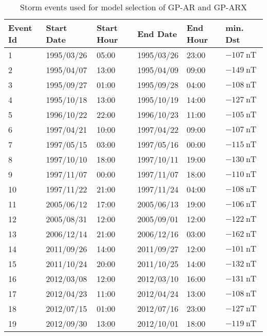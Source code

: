     \begin{table}[h]
    \centering
    \caption{Storm events used for model selection of GP-AR and GP-ARX}
    \label{table:validationstorms}
    \begin{tabular}{llllll}
    \hline
    Event Id & Start Date & Start Hour & End Date & End Hour & min. Dst \\ \hline
    1 & 1995/03/26 & 05:00 & 1995/03/26 & 23:00 & $ \SI{-107}{\nano\tesla}$ \\
    2 & 1995/04/07 & 13:00 & 1995/04/09 & 09:00 & $ \SI{-149}{\nano\tesla}$ \\
    3 & 1995/09/27 & 01:00 & 1995/09/28 & 04:00 & $ \SI{-108}{\nano\tesla}$ \\
    4 & 1995/10/18 & 13:00 & 1995/10/19 & 14:00 & $ \SI{-127}{\nano\tesla}$ \\
    5 & 1996/10/22 & 22:00 & 1996/10/23 & 11:00 & $ \SI{-105}{\nano\tesla}$ \\
    6 & 1997/04/21 & 10:00 & 1997/04/22 & 09:00 & $ \SI{-107}{\nano\tesla}$ \\
    7 & 1997/05/15 & 03:00 & 1997/05/16 & 00:00 & $ \SI{-115}{\nano\tesla}$ \\
    8 & 1997/10/10 & 18:00 & 1997/10/11 & 19:00 & $ \SI{-130}{\nano\tesla}$ \\
    9 & 1997/11/07 & 00:00 & 1997/11/07 & 18:00 & $ \SI{-110}{\nano\tesla}$ \\
    10 & 1997/11/22 & 21:00 & 1997/11/24 & 04:00 & $ \SI{-108}{\nano\tesla}$ \\
    11 & 2005/06/12 & 17:00 & 2005/06/13 & 19:00 & $ \SI{-106}{\nano\tesla}$ \\
    12 & 2005/08/31 & 12:00 & 2005/09/01 & 12:00 & $ \SI{-122}{\nano\tesla}$ \\
    13 & 2006/12/14 & 21:00 & 2006/12/16 & 03:00 & $ \SI{-162}{\nano\tesla}$ \\
    14 & 2011/09/26 & 14:00 & 2011/09/27 & 12:00 & $ \SI{-101}{\nano\tesla}$ \\
    15 & 2011/10/24 & 20:00 & 2011/10/25 & 14:00 & $ \SI{-132}{\nano\tesla}$ \\
    16 & 2012/03/08 & 12:00 & 2012/03/10 & 16:00 & $ \SI{-131}{\nano\tesla}$ \\
    17 & 2012/04/23 & 11:00 & 2012/04/24 & 13:00 & $ \SI{-108}{\nano\tesla}$ \\
    18 & 2012/07/15 & 01:00 & 2012/07/16 & 23:00 & $ \SI{-127}{\nano\tesla}$ \\
    19 & 2012/09/30 & 13:00 & 2012/10/01 & 18:00 & $ \SI{-119}{\nano\tesla}$ \\

\end{tabular}
\end{table}
